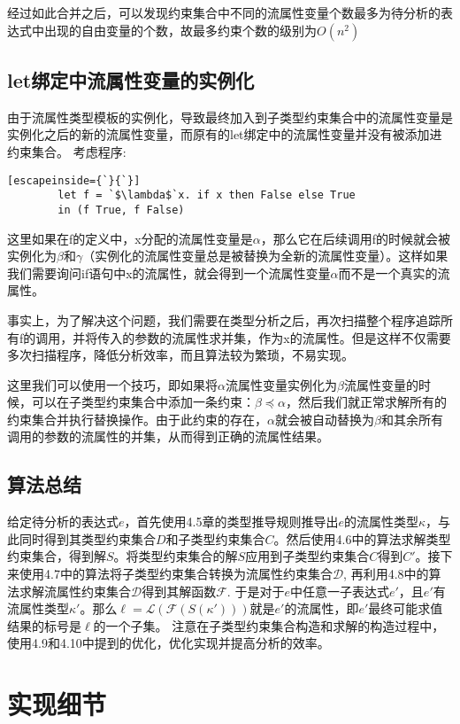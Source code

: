 \documentclass[UTF8, colorlinks]{pkuthss}
\begin{document}
	经过如此合并之后，可以发现约束集合中不同的流属性变量个数最多为待分析的表达式中出现的自由变量的个数，故最多约束个数的级别为$O(n^2)$
	
	\section{let绑定中流属性变量的实例化}
	由于流属性类型模板的实例化，导致最终加入到子类型约束集合中的流属性变量是实例化之后的新的流属性变量，而原有的let绑定中的流属性变量并没有被添加进约束集合。
	考虑程序:
	\begin{lstlisting}[escapeinside={`}{`}]
		let f = `$\lambda$`x. if x then False else True
		in (f True, f False)
	\end{lstlisting}
	这里如果在f的定义中，x分配的流属性变量是$\alpha$，那么它在后续调用f的时候就会被实例化为$\beta$和$\gamma$（实例化的流属性变量总是被替换为全新的流属性变量）。这样如果我们需要询问if语句中x的流属性，就会得到一个流属性变量$\alpha$而不是一个真实的流属性。
	
	事实上，为了解决这个问题，我们需要在类型分析之后，再次扫描整个程序追踪所有f的调用，并将传入的参数的流属性求并集，作为x的流属性。但是这样不仅需要多次扫描程序，降低分析效率，而且算法较为繁琐，不易实现。
	
	这里我们可以使用一个技巧，即如果将$\alpha$流属性变量实例化为$\beta$流属性变量的时候，可以在子类型约束集合中添加一条约束：$\beta\preceq\alpha$，然后我们就正常求解所有的约束集合并执行替换操作。由于此约束的存在，$\alpha$就会被自动替换为$\beta$和其余所有调用的参数的流属性的并集，从而得到正确的流属性结果。
	
	\section{算法总结}
	给定待分析的表达式$e$，首先使用4.5章的类型推导规则推导出$e$的流属性类型$\kappa$，与此同时得到其类型约束集合$D$和子类型约束集合$C$。然后使用4.6中的算法求解类型约束集合，得到解$S$。将类型约束集合的解$S$应用到子类型约束集合$C$得到$C'$。接下来使用4.7中的算法将子类型约束集合转换为流属性约束集合$\mathcal{D}$, 再利用4.8中的算法求解流属性约束集合$\mathcal{D}$得到其解函数$\mathcal{F}$. 于是对于$e$中任意一子表达式$e'$，且$e'$有流属性类型$\kappa'$。那么$\ell = \mathcal{L}(\mathcal{F}(S(\kappa')))$就是$e'$的流属性，即$e'$最终可能求值结果的标号是$\ell$的一个子集。 注意在子类型约束集合构造和求解的构造过程中，使用4.9和4.10中提到的优化，优化实现并提高分析的效率。
	
	\chapter{实现细节}
\end{document}
